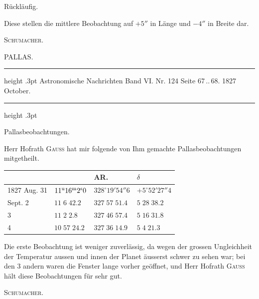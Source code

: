 Rückläufig.

Diese stellen die mittlere Beobachtung auf $+5''$ in Länge und $-4''$ in Breite dar.
\begin{flushright}\textsc{Schumacher.}\end{flushright}

\par\bigskip
{}
\hypertarget{native-465-pallas}{}
\begin{center}{\large PALLAS.}\end{center}

\begin{center}
\parbox{.78\linewidth}{%
\centering\small
\hrule height .3pt\relax\vspace{2.5pt}
Astronomische Nachrichten Band VI. Nr. 124 Seite 67\,..\,68. 1827 October.\par
\vspace{2.5pt}\hrule height .3pt\relax
}
\end{center}

\begin{center}Pallasbeobachtungen.\end{center}

Herr Hofrath \textsc{Gauss} hat mir folgende von Ihm gemachte Pallasbeobachtungen mitgetheilt.

\begin{center}
\begin{tabular}{l|l|l|l}
 & & AR. & $\delta$ \\
\hline
1827 Aug. 31 & $11^{\rm u}16^{\rm m}2^{\rm s}0$ & $328^\circ19'54''6$ & $+5^\circ52'27''4$ \\
\hfill Sept. 2 & $11\;6\;42.2$ & $327\;57\;51.4$ & $5\;28\;38.2$ \\
\hfill 3 & $11\;2\;2.8$ & $327\;46\;57.4$ & $5\;16\;31.8$ \\
\hfill 4 & $10\;57\;24.2$ & $327\;36\;14.9$ & $5\;4\;21.3$ \\
\end{tabular}
\end{center}

Die erste Beobachtung ist weniger zuverlässig, da wegen der grossen Ungleichheit der Temperatur aussen und innen der Planet äusserst schwer zu sehen war; bei den 3 andern waren die Fenster lange vorher geöffnet, und Herr Hofrath \textsc{Gauss} hält diese Beobachtungen für sehr gut.
\begin{flushright}\textsc{Schumacher.}\end{flushright}


